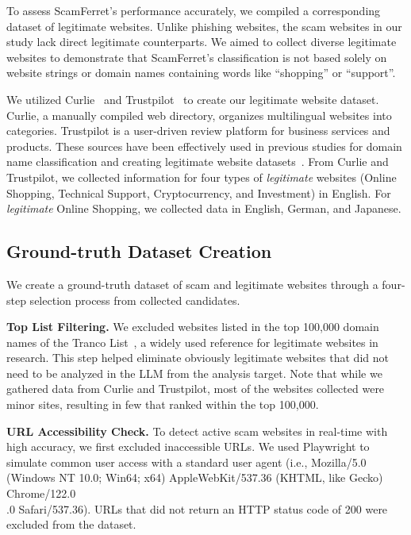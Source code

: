 \documentclass[runningheads]{llncs}
\begin{document}
To assess ScamFerret's performance accurately, we compiled a corresponding dataset of legitimate websites.
Unlike phishing websites, the scam websites in our study lack direct legitimate counterparts.
We aimed to collect diverse legitimate websites to demonstrate that ScamFerret's classification is not based solely on website strings or domain names containing words like ``shopping'' or ``support''.

We utilized Curlie~\cite{curlie} and Trustpilot~\cite{trustpilot} to create our legitimate website dataset.
Curlie, a manually compiled web directory, organizes multilingual websites into categories.
Trustpilot is a user-driven review platform for business services and products.
These sources have been effectively used in previous studies for domain name classification and creating legitimate website datasets~\cite{DBLP:conf/imc/VallinaPFPGBHTV20,DBLP:conf/acsac/KotziasRPSB23}.
From Curlie and Trustpilot, we collected information for four types of \textit{legitimate} websites (Online Shopping, Technical Support, Cryptocurrency, and Investment) in English.
For \textit{legitimate} Online Shopping, we collected data in English, German, and Japanese.

\subsection{Ground-truth Dataset Creation}
We create a ground-truth dataset of scam and legitimate websites through a four-step selection process from collected candidates.

\noindent\textbf{Top List Filtering.}
We excluded websites listed in the top 100,000 domain names of the Tranco List~\cite{DBLP:conf/ndss/PochatGTKJ19}, a widely used reference for legitimate websites in research.
This step helped eliminate obviously legitimate websites that did not need to be analyzed in the LLM from the analysis target.
Note that while we gathered data from Curlie and Trustpilot, most of the websites collected were minor sites, resulting in few that ranked within the top 100,000.

\noindent\textbf{URL Accessibility Check.}
To detect active scam websites in real-time with high accuracy, we first excluded inaccessible URLs.
We used Playwright to simulate common user access with a standard user agent (i.e., Mozilla/5.0 (Windows NT 10.0; Win64; x64) AppleWebKit/537.36 (KHTML, like Gecko) Chrome/122.0\\.0 Safari/537.36).
URLs that did not return an HTTP status code of 200 were excluded from the dataset.
\end{document}
